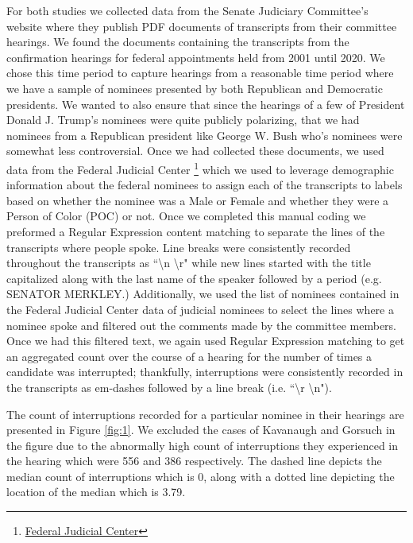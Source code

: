 \documentclass [12pt]{article}
\begin{document}
For both studies we collected data from the Senate Judiciary Committee's website where they publish PDF documents of transcripts from their committee hearings. We found the documents containing the transcripts from the confirmation hearings for federal appointments held from 2001 until 2020. We chose this time period to capture hearings from a reasonable time period where we have a sample of nominees presented by both Republican and Democratic presidents. We wanted to also ensure that since the hearings of a few of President Donald J. Trump's nominees were quite publicly polarizing, that we had nominees from a Republican president like George W. Bush who's nominees were somewhat less controversial. Once we had collected these documents, we used data from the Federal Judicial Center \footnote{\href{https://www.fjc.gov/}{Federal Judicial Center}} which we used to leverage demographic information about the federal nominees to assign each of the transcripts to labels based on whether the nominee was a Male or Female and whether they were a Person of Color (POC) or not. Once we completed this manual coding we preformed a Regular Expression content matching to separate the lines of the transcripts where people spoke. Line breaks were consistently recorded throughout the transcripts as ``\textbackslash n \textbackslash r" while new lines started with the title capitalized along with the last name of the speaker followed by a period (e.g. SENATOR MERKLEY.) Additionally, we used the list of nominees contained in the Federal Judicial Center data of judicial nominees to select the lines where a nominee spoke and filtered out the comments made by the committee members. Once we had this filtered text, we again used Regular Expression matching to get an aggregated count over the course of a hearing for the number of times a candidate was interrupted; thankfully, interruptions were consistently recorded in the transcripts as em-dashes followed by a line break (i.e. ``\textbackslash r \textbackslash n"). 
	
The count of interruptions recorded for a particular nominee in their hearings are presented in Figure \ref{fig:1}. We excluded the cases of Kavanaugh and Gorsuch in the figure due to the abnormally high count of interruptions they experienced in the hearing which were 556 and 386 respectively. The dashed line depicts the median count of interruptions which is 0, along with a dotted line depicting the location of the median which is 3.79.
	
\end{document}
